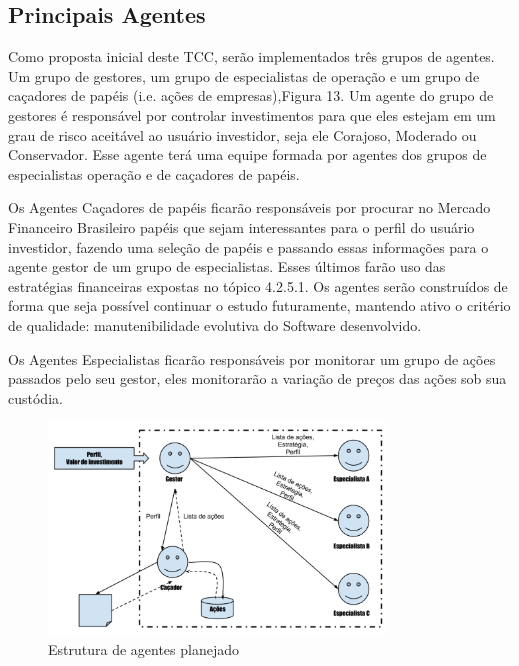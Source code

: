 \subsection{Principais Agentes}

Como proposta inicial deste TCC, serão implementados três grupos de agentes. Um grupo de gestores, um grupo de especialistas de operação e um grupo de caçadores de papéis (i.e. ações de empresas),Figura 13. Um agente do grupo de gestores é responsável por controlar investimentos para que eles estejam em um grau de risco aceitável ao usuário investidor, seja ele Corajoso, Moderado ou Conservador. Esse agente terá uma equipe formada por agentes dos grupos de especialistas operação e de caçadores de papéis.

Os Agentes Caçadores de papéis ficarão responsáveis por procurar no Mercado Financeiro Brasileiro papéis que sejam interessantes para o perfil do usuário investidor, fazendo uma seleção de papéis e passando essas informações para o agente gestor de um grupo de especialistas. Esses últimos farão uso das estratégias financeiras expostas no tópico 4.2.5.1. Os agentes serão construídos de forma que seja possível continuar o estudo futuramente, mantendo ativo o critério de qualidade: manutenibilidade evolutiva do Software desenvolvido.

Os Agentes Especialistas ficarão responsáveis por monitorar um grupo de ações passados pelo seu gestor, eles monitorarão a variação de preços das ações sob sua custódia.

\begin{figure}[h]
\centering
\label{f13}
\includegraphics[width=0.8\textwidth]{figuras/f13}
\caption{Estrutura de agentes planejado }

\end{figure}

